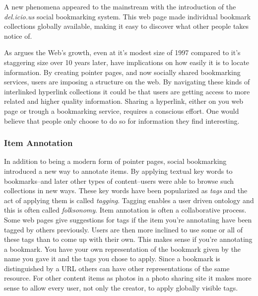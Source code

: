 
A new phenomena appeared to the mainstream with the introduction of the
\emph{del.icio.us} social bookmarking system. This web page made individual
bookmark collections globally available, making it easy to discover what other
people takes notice of.

As \citet[p.~806]{dieberger97} argues the Web's growth, even at it's modest
size of 1997 compared to it's staggering size over 10 years later, have
implications on how easily it is to locate information. By creating pointer
pages, and now socially shared bookmarking services, users are imposing a
structure on the web. By navigating these kinds of interlinked hyperlink
collections it could be that users are getting access to more related and
higher quality information. Sharing a hyperlink, either on you web page or
trough a bookmarking service, requires a conscious effort. One would believe
that people only choose to do so for information they find interesting.

\subsubsection{Item Annotation}

In addition to being a modern form of pointer pages, social bookmarking
introduced a new way to annotate items. By applying textual key words to
bookmarks--and later other types of content--users were able to browse such
collections in new ways. These key words have been popularized as \emph{tags}
and the act of applying them is called \emph{tagging}. Tagging enables a user
driven ontology and this is often called \emph{folksonomy}.
Item annotation is often a collaborative process. Some web pages give
suggestions for tags if the item you're annotating have been tagged by others
previously. Users are then more inclined to use some or all of these tags than
to come up with their own. This makes sense if you're annotating a bookmark.
You have your own representation of the bookmark given by the name you gave it
and the tags you chose to apply. Since a bookmark is distinguished by a
URL others can have other representations of the same resource. For other
content items as photos in a photo sharing site it makes more sense to allow
every user, not only the creator, to apply globally visible tags.


